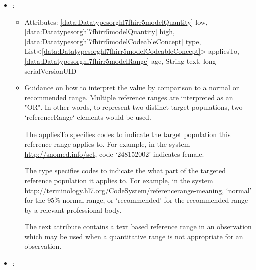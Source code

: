 \begin{itemize}[nolistsep,noitemsep]
\begin{itemize}
The dataAbsentReason provides a reason why the expected value in the element Observation.component.value[x] is missing.
For example, in the system \url{http://terminology.hl7.org/CodeSystem/data-absent-reason}, `not-applicable'.

The interpretation provides a categorical assessment of an observation value. For example, high, low, normal.
For example, in the system \url{http://terminology.hl7.org/CodeSystem/v3-ObservationInterpretation}, `H' for high, or `ND' for not detected.
\end{itemize}

\item {}: 
\begin{itemize}[noitemsep,nolistsep]
\item[] Attributes: \ref{data:Datatypesorghl7fhirr5modelQuantity} low, \ref{data:Datatypesorghl7fhirr5modelQuantity} high, \ref{data:Datatypesorghl7fhirr5modelCodeableConcept} type, List\textless{}\ref{data:Datatypesorghl7fhirr5modelCodeableConcept}\textgreater{} appliesTo, \ref{data:Datatypesorghl7fhirr5modelRange} age, String text, long serialVersionUID
\item[] Guidance on how to interpret the value by comparison to a normal or recommended range.  Multiple reference ranges are interpreted as an "OR".   In other words, to represent two distinct target populations, two `referenceRange` elements would be used.

The appliesTo specifies codes to indicate the target population this reference range applies to.
For example, in the system \url{http://snomed.info/sct}, code `248152002' indicates female.

The type specifies codes to indicate the what part of the targeted reference population it applies to.
For example, in the system \url{http://terminology.hl7.org/CodeSystem/referencerange-meaning}, `normal' for the 95\% normal range, or `recommended' for the recommended range by a relevant professional body.

The text attribute contains a text based reference range in an observation which may be used when a quantitative range is not appropriate for an observation.
\end{itemize}

\item {}: 
\begin{itemize}


\end{itemize}
\end{itemize}
